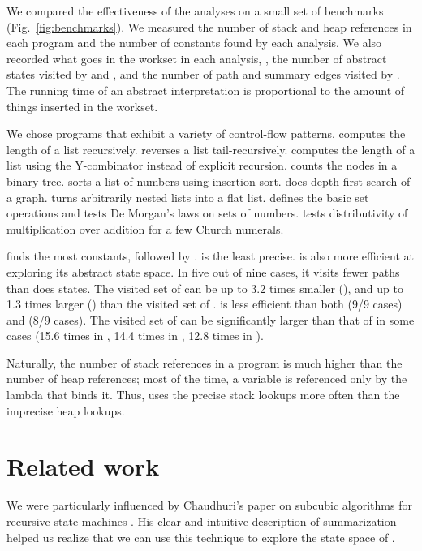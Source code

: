 \documentclass{LMCS}
\theoremstyle{definition} \newtheorem{property}[thm]{Property}
\begin{document}
We compared the effectiveness of the analyses on a small set of 
benchmarks (Fig.~\ref{fig:benchmarks}).
We measured the number of stack and heap references in each program and the 
number of constants found by each analysis.
We also recorded  what goes in the workset in each analysis, \ie, the number of
abstract states visited by  and , and the number of path and 
summary edges visited by \cfat.
The running time of an abstract interpretation is proportional to the amount of
things inserted in the workset.

We chose programs that exhibit a variety of control-flow patterns.
 computes the length of a list recursively. 
 reverses a list tail-recursively.
 computes the length of a list using the Y-combinator instead of
explicit recursion.
 counts the nodes in a binary tree.
 sorts a list of numbers using insertion-sort.
 does depth-first search of a graph.
 turns arbitrarily nested lists into a flat list.
 defines the basic set operations and tests De Morgan's laws on sets of
numbers.
 tests distributivity of multiplication over addition for
a few Church numerals.

\cfat{} finds the most constants, followed by .
 is the least precise.
\cfat{} is also more efficient at exploring its abstract state space.
In five out of nine cases, it visits fewer paths than  does states.
The visited set of \cfat{} can be up to 3.2 times smaller (), 
and up to 1.3 times larger () than the visited set of .
 is less efficient than both  (9/9 cases) and \cfat{} (8/9 cases).
The visited set of  can be significantly larger than that of \cfat{} in 
some cases (15.6 times in , 14.4 times in , 
12.8 times in ).

Naturally, the number of stack references in a program is much higher than
the number of heap references; 
most of the time, a variable is referenced only by the lambda that binds it.
Thus, \cfat{} uses the precise stack lookups more often than the imprecise
heap lookups.


\section{Related work\label{sec:related}}

\noindent We were particularly influenced by Chaudhuri's paper on subcubic algorithms for
recursive state machines \cite{conf/popl/08/chaudhuri/subcubic}.
His clear and intuitive description of summarization helped us realize that we
can use this technique to explore the state space of \cfat.
\end{document}
